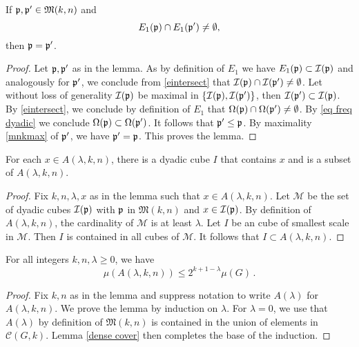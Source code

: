 {\begin{lemma}\label{pairwise disjoint}
     If $\mathfrak p, \mathfrak p' \in {\mathfrak{M}}(k,n)$ and
     \begin{equation}\label{eintersect}
     {E_1}(\mathfrak p)\cap {E_1}(\mathfrak p')\neq \emptyset,
     \end{equation}
     then $\mathfrak p=\mathfrak p'$.
\end{lemma}
\begin{proof}
Let $\mathfrak p,\mathfrak p'$ as in the lemma. As by definition of $E_1$
we have
$E_1(\mathfrak p)\subset \mathcal{I}(\mathfrak p)$ and analogously for $\mathfrak p'$, we conclude from \eqref{eintersect} that  $\mathcal{I}(\mathfrak p)\cap \mathcal{I}(\mathfrak p')\neq \emptyset$. Let without loss of generality $\mathcal{I}(\mathfrak p)$ be maximal in
$\{\mathcal{I}(\mathfrak p),\mathcal{I}(\mathfrak p')\}$, then $\mathcal{I}(\mathfrak p')\subset \mathcal{I}(\mathfrak p)$.
By \eqref{eintersect}, we conclude by definition of $E_1$ that $\Omega(\mathfrak p)\cap \Omega(\mathfrak p')\neq \emptyset$. By
\eqref{eq freq dyadic} we conclude $\Omega(\mathfrak p)\subset \Omega(\mathfrak p')$. It follows that $\mathfrak p'\le \mathfrak p$. By maximality
\eqref{mnkmax}
of $\mathfrak p'$, we have $\mathfrak p'=\mathfrak p$. This proves the lemma.
\end{proof}


\begin{lemma}\label{dyadic union}
For each  $x\in A(\lambda,k,n)$,
there is a dyadic cube $I$
that contains $x$ and is
a subset of
$A(\lambda,k,n)$.
\end{lemma}

\begin{proof}

Fix $k,n,\lambda,x$ as in the lemma such that
$x\in A(\lambda,k,n)$. Let
$\mathcal{M}$ be the set of dyadic cubes
 $\mathcal{I}(\mathfrak p)$
with $\mathfrak p$ in  $\mathfrak{M}(k,n)$
and $x\in \mathcal{I}(\mathfrak p)$. By definition of
$A(\lambda,k,n)$, the cardinality of $\mathcal{M}$
is at least $\lambda$. Let $I$ be an cube of
smallest scale in $\mathcal{M}$. Then
$I$ is contained in all cubes of $\mathcal{M}$.
It follows that $I\subset A(\lambda,k,n)$.
\end{proof}

\begin{lemma}\label{john nirenberg}
    For all integers $k,n,\lambda\ge 0$, we have
    \begin{equation}\label{alambdameasure}
        \mu(A(\lambda,k,n))        \le 2^{k+1-\lambda}\mu(G)\, .
    \end{equation}


\end{lemma}
\begin{proof}
Fix $k,n$ as in the lemma
and suppress notation to write
$A(\lambda)$ for $A(\lambda,k,n)$.
We prove the lemma by induction on $\lambda$.
For $\lambda=0$, we use that $A(\lambda)$ by definition of $\mathfrak{M}(k,n)$ is contained in the union of elements in $ \mathcal{C}(G,k)$. Lemma \ref{dense cover} then completes  the base of the induction.


\end{proof}}
